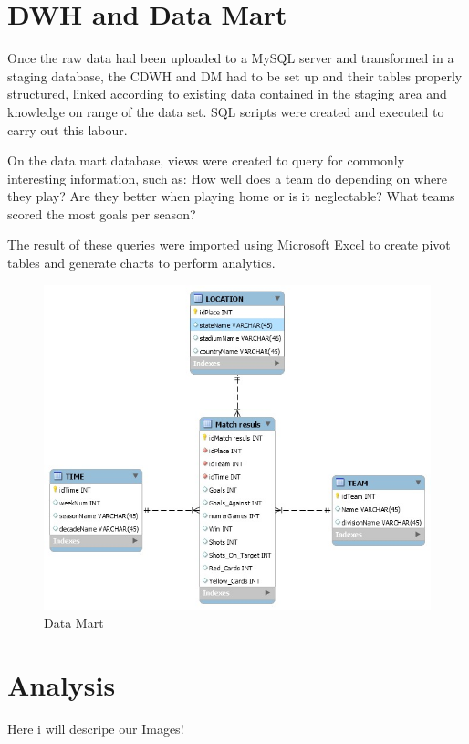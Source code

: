 \documentclass[11pt, journal]{IEEEtran}
\begin{document}
\section{DWH and Data Mart} \label{sec:further}
Once the raw data had been uploaded to a MySQL server and transformed in a staging database, the CDWH and DM had to be set up and their tables
properly structured, linked according to existing data contained in the staging area and knowledge on range of the data set. SQL scripts were 
created and executed to carry out this labour. 

On the data mart database, views were created to query for commonly interesting information, such as: How well does a team do depending on where
they play? Are they better when playing home or is it neglectable? What teams scored the most goals per season?

The result of these queries were imported using Microsoft Excel to create pivot tables and generate charts to perform analytics.

\begin{figure}[htb]
	\centering
		\includegraphics[width=1.0\columnwidth]{images/datamart}
	\caption{Data Mart}
	\label{fig:probov}
\end{figure}
\section{Analysis} \label{sec:analy}
Here i will descripe our Images!
\end{document}
